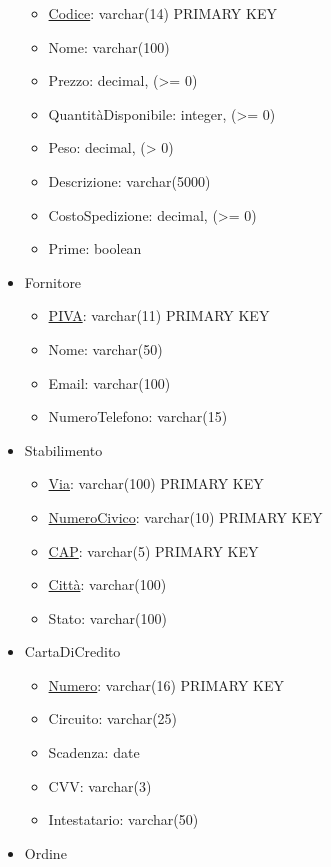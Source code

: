 \documentclass[10pt]{article}
\begin{document}
\begin{itemize}
\begin{itemize}
        \itemsep0em 
        \item \underline{Codice}: varchar(14) PRIMARY KEY
        \item Nome: varchar(100)
        \item Prezzo: decimal, (\textgreater{}= 0)
        \item QuantitàDisponibile: integer, (\textgreater{}= 0)
        \item Peso: decimal, (\textgreater{} 0)
        \item Descrizione: varchar(5000)
        \item CostoSpedizione: decimal, (\textgreater{}= 0)
        \item Prime: boolean
    \end{itemize}
    \item Fornitore
    \begin{itemize}
        \itemsep0em 
        \item \underline{PIVA}: varchar(11) PRIMARY KEY
        \item Nome: varchar(50)
        \item Email: varchar(100)
        \item NumeroTelefono: varchar(15)
    \end{itemize}
    \item Stabilimento
    \begin{itemize}
        \itemsep0em 
        \item \underline{Via}: varchar(100) PRIMARY KEY
        \item \underline{NumeroCivico}: varchar(10) PRIMARY KEY
        \item \underline{CAP}: varchar(5) PRIMARY KEY
        \item \underline{Città}: varchar(100)
        \item Stato: varchar(100)
    \end{itemize}
    \item CartaDiCredito
    \begin{itemize}
        \itemsep0em 
        \item \underline{Numero}: varchar(16) PRIMARY KEY
        \item Circuito: varchar(25)
        \item Scadenza: date
        \item CVV: varchar(3)
        \item Intestatario: varchar(50)
    \end{itemize}
    \item Ordine

\end{itemize}
\end{document}
